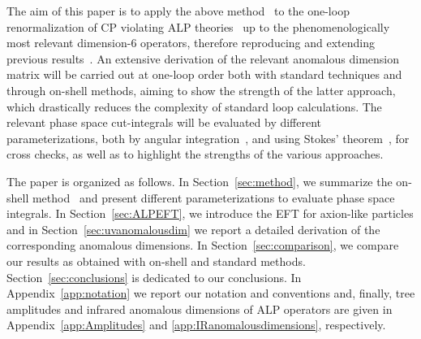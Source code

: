 The aim of this paper is to apply the above method~\cite{Caron-Huot:2016cwu,Bresciani:2023jsu} to the one-loop renormalization of CP violating 
ALP theories~\cite{Marciano:2016yhf,DiLuzio:2020oah} up to the phenomenologically most relevant dimension-6 operators, therefore reproducing and extending previous results~\cite{DasBakshi:2023lca}.
%
An extensive derivation of the relevant anomalous dimension matrix will be carried out at one-loop order both with standard techniques and through on-shell methods, aiming to show the strength of the latter approach, which drastically reduces the complexity of standard loop calculations. The relevant phase space cut-integrals will be evaluated by different parameterizations, both by angular integration~\cite{Zwiebel:2011bx,Caron-Huot:2016cwu,EliasMiro:2020tdv,Baratella:2020lzz,Bern:2020ikv,Baratella:2020dvw}, and using Stokes' theorem~\cite{Mastrolia:2009dr,Jiang:2020mhe,Shu:2021qlr,Baratella:2021guc}, 
for cross checks, as well as to highlight the strengths of the various approaches.

The paper is organized as follows. In Section~\ref{sec:method}, we summarize the 
on-shell method~\cite{Caron-Huot:2016cwu} and present different parameterizations to evaluate phase space integrals.
In Section~\ref{sec:ALPEFT}, we introduce the EFT for axion-like particles and in Section~\ref{sec:uvanomalousdim} we report a detailed derivation of the corresponding anomalous dimensions.
In Section~\ref{sec:comparison}, we compare our results as obtained with on-shell and standard methods.
Section~\ref{sec:conclusions} is dedicated to our conclusions.
In Appendix~\ref{app:notation} we report our notation and conventions and, finally, tree amplitudes and infrared anomalous dimensions of ALP operators are given in Appendix~\ref{app:Amplitudes} and \ref{app:IRanomalousdimensions}, respectively.

